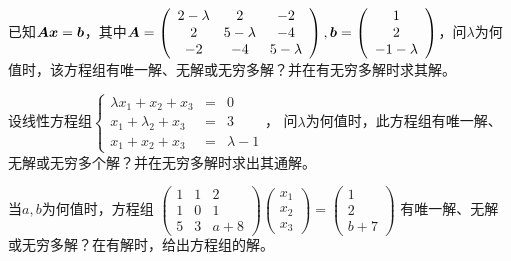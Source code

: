 \begin{frame}\ft{\subsecname}
  
    \begin{li}[2005-2006第一学期]
      已知$\boldsymbol{A}{\boldsymbol{x}}={\boldsymbol{b}}$，其中$\boldsymbol{A}=\left(
      \begin{array}{ccc}
        2-\lambda & 2 & -2\\
        2 & 5-\lambda & -4\\
        -2 & -4 & 5-\lambda
      \end{array}
      \right), {\boldsymbol{b}}=\left(
      \begin{array}{c}
        1\\2\\-1-\lambda
      \end{array}
      \right)$，问$\lambda$为何值时，该方程组有唯一解、无解或无穷多解？并在有无穷多解时求其解。
    \end{li}
\end{frame}


\begin{frame}\ft{\subsecname}
    \begin{li}
      设线性方程组$\left\{
      \begin{array}{rcl}
        \lambda x_1+x_2+x_3&=&0\\
        x_1+\lambda_2+x_3&=&3\\
        x_1+x_2+x_3&=&\lambda-1
      \end{array}
      \right.$，
      问$\lambda$为何值时，此方程组有唯一解、无解或无穷多个解？并在无穷多解时求出其通解。
    \end{li}
  
\end{frame}


\begin{frame}\ft{\subsecname}
  
    \begin{li}[2006-2007第一学期]
      当$a,b$为何值时，方程组
      $
      \left(
      \begin{array}{ccc}
        1&1&2\\
        1&0&1\\
        5&3&a+8
      \end{array}
      \right)\left(
      \begin{array}{c}
        x_1\\x_2\\x_3
      \end{array}
      \right)=\left(
      \begin{array}{c}
        1\\2\\b+7
      \end{array}
      \right)
      $
      有唯一解、无解或无穷多解？在有解时，给出方程组的解。
    \end{li}
\end{frame}



